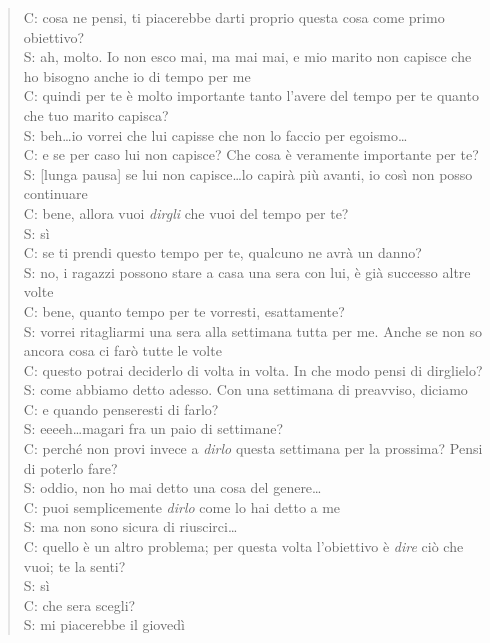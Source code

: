\begin{verse}
C: cosa ne pensi, ti piacerebbe darti proprio questa cosa come primo obiettivo?\\
S: ah, molto. Io non esco mai, ma mai mai, e mio marito non capisce che ho bisogno anche io di tempo per me\\
C: quindi per te è molto importante tanto l'avere del tempo per te quanto che tuo marito capisca?\\
S: beh\ldots io vorrei che lui capisse che non lo faccio per egoismo\ldots\\
C: e se per caso lui non capisce? Che cosa è veramente importante per te?\\
S: [lunga pausa] se lui non capisce\ldots lo capirà più avanti, io così non posso continuare\\
C: bene, allora vuoi \emph{dirgli} che vuoi del tempo per te?\\ 
S: sì\\
C: se ti prendi questo tempo per te, qualcuno ne avrà un danno?\\
S: no, i ragazzi possono stare a casa una sera con lui, è già successo altre volte\\
C: bene, quanto tempo per te vorresti, esattamente?\\
S: vorrei ritagliarmi una sera alla settimana tutta per me. Anche se non so ancora cosa ci farò tutte le volte\\
C: questo potrai deciderlo di volta in volta. In che modo pensi di dirglielo?\\
S: come abbiamo detto adesso. Con una settimana di preavviso, diciamo\\
C: e quando penseresti di farlo?\\
S: eeeeh\dots magari fra un paio di settimane?\\
C: perché non provi invece a \emph{dirlo} questa settimana per la prossima? Pensi di poterlo fare?\\
S: oddio, non ho mai detto una cosa del genere\dots\\
C: puoi semplicemente \emph{dirlo} come lo hai detto a me\\
S: ma non sono sicura di riuscirci\ldots\\
C: quello è un altro problema; per questa volta l'obiettivo è \emph{dire} ciò che vuoi; te la senti?\\
S: sì\\
C: che sera scegli?\\
S: mi piacerebbe il giovedì\\

\end{verse}
